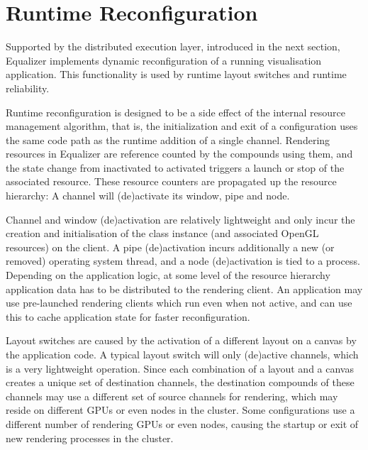 \section{Runtime Reconfiguration}

Supported by the distributed execution layer, introduced in the next section,
Equalizer implements dynamic reconfiguration of a running visualisation
application. This functionality is used by runtime layout switches and runtime
reliability.

Runtime reconfiguration is designed to be a side effect of the internal resource
management algorithm, that is, the initialization and exit of a configuration
uses the same code path as the runtime addition of a single channel. Rendering
resources in Equalizer are reference counted by the compounds using them, and the
state change from inactivated to activated triggers a launch or stop of the
associated resource. These resource counters are propagated up the resource
hierarchy: A channel will (de)activate its window, pipe and node.

Channel and window (de)activation are relatively lightweight and only incur the
creation and initialisation of the class instance (and associated OpenGL
resources) on the client. A pipe (de)activation incurs additionally a new (or
removed) operating system thread, and a node (de)activation is tied to a
process. Depending on the application logic, at some level of the resource
hierarchy application data has to be distributed to the rendering client. An
application may use pre-launched rendering clients which run even when not
active, and can use this to cache application state for faster reconfiguration.

Layout switches are caused by the activation of a different layout on a canvas
by the application code. A typical layout switch will only (de)active channels,
which is a very lightweight operation. Since each combination of a layout and a
canvas creates a unique set of destination channels, the destination compounds
of these channels may use a different set of source channels for rendering,
which may reside on different GPUs or even nodes in the cluster. Some
configurations use a different number of rendering GPUs or even nodes,
 causing the startup or exit of new rendering processes in the cluster.

